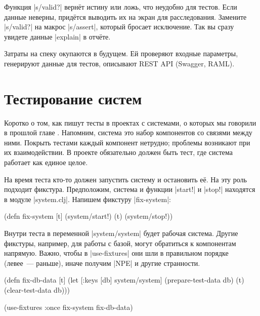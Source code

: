 Функция \spverb|s/valid?| верн\"{е}т истину или ложь, что неудобно для тестов. Если
данные неверны, прид\"{е}тся выводить их на экран для расследования. Замените
\spverb|s/valid?| на макрос \spverb|s/assert|, который бросает исключение. Так
вы сразу увидете данные \spverb|explain| в отч\"{е}те.


Затраты на спеку окупаются в будущем. Ей проверяют входные параметры, генерируют
данные для тестов, описывают REST API (Swagger, RAML).

\section{Тестирование систем}


Коротко о том, как пишут тесты в проектах с системами, о которых мы говорили в
прошлой главе . Напомним, система это набор компонентов со
связями между ними. Покрыть тестами каждый компонент нетрудно; проблемы
возникают при их взаимодействии. В проекте обязательно должен быть тест, где
система работает как единое целое.


На время теста кто-то должен запустить систему и остановить е\"{е}. На эту роль
подходит фикстура. Предположим, система и функции \spverb|start!| и
\spverb|stop!| находятся в модуле \spverb|system.clj|. Напишем фикстуру
\spverb|fix-system|:

\begin{english}
  \begin{clojure}
(defn fix-system [t]
  (system/start!)
  (t)
  (system/stop!))
  \end{clojure}
\end{english}

Внутри теста в переменной \spverb|system/system| будет рабочая система. Другие
фикстуры, например, для работы с базой, могут обратиться к компонентам
напрямую. Важно, чтобы в \spverb|use-fixtures| они шли в правильном порядке
(левее~--- раньше), иначе получим \spverb|NPE| и другие странности.


\begin{english}
  \begin{clojure}
(defn fix-db-data [t]
  (let [{:keys [db]} system/system]
    (prepare-test-data db)
    (t)
    (clear-test-data db)))

(use-fixtures :once fix-system fix-db-data)
  \end{clojure}
\end{english}

